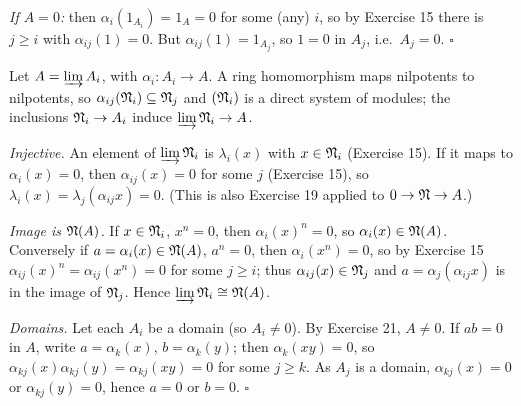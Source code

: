 \documentclass[11pt]{article}
\begin{document}
\emph{If $A=0$:} then $\alpha_i(1_{A_i})=1_A=0$ for some (any) $i$, so by Exercise 15 there is $j\ge i$ with $\alpha_{ij}(1)=0$. But $\alpha_{ij}(1)=1_{A_j}$, so $1=0$ in $A_j$, i.e.\ $A_j=0$. \hfill$\square$

\pf
Let $A=\varinjlim A_i$, with $\alpha_i:A_i\to A$. A ring homomorphism maps nilpotents to nilpotents, so $\alpha_{ij}(\mathfrak N_i)\subseteq\mathfrak N_j$ and $(\mathfrak N_i)$ is a direct system of modules; the inclusions $\mathfrak N_i\to A_i$ induce $\varinjlim\mathfrak N_i\to A$.

\emph{Injective.} An element of $\varinjlim\mathfrak N_i$ is $\lambda_i(x)$ with $x\in\mathfrak N_i$ (Exercise 15). If it maps to $\alpha_i(x)=0$, then $\alpha_{ij}(x)=0$ for some $j$ (Exercise 15), so $\lambda_i(x)=\lambda_j(\alpha_{ij}x)=0$. (This is also Exercise 19 applied to $0\to\mathfrak N\to A$.)

\emph{Image is $\mathfrak N(A)$.} If $x\in\mathfrak N_i$, $x^n=0$, then $\alpha_i(x)^n=0$, so $\alpha_i(x)\in\mathfrak N(A)$. Conversely if $a=\alpha_i(x)\in\mathfrak N(A)$, $a^n=0$, then $\alpha_i(x^n)=0$, so by Exercise 15 $\alpha_{ij}(x)^n=\alpha_{ij}(x^n)=0$ for some $j\ge i$; thus $\alpha_{ij}(x)\in\mathfrak N_j$ and $a=\alpha_j(\alpha_{ij}x)$ is in the image of $\mathfrak N_j$. Hence $\varinjlim\mathfrak N_i\cong\mathfrak N(A)$.

\emph{Domains.} Let each $A_i$ be a domain (so $A_i\ne0$). By Exercise 21, $A\ne0$. If $ab=0$ in $A$, write $a=\alpha_k(x)$, $b=\alpha_k(y)$; then $\alpha_k(xy)=0$, so $\alpha_{kj}(x)\alpha_{kj}(y)=\alpha_{kj}(xy)=0$ for some $j\ge k$. As $A_j$ is a domain, $\alpha_{kj}(x)=0$ or $\alpha_{kj}(y)=0$, hence $a=0$ or $b=0$. \hfill$\square$
\end{document}
